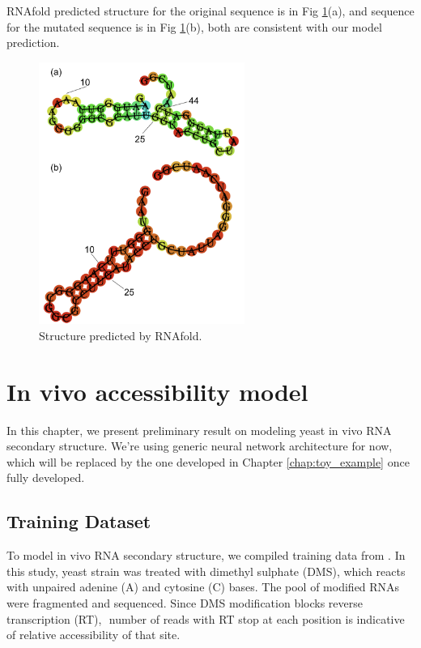 \documentclass{proposal}
\begin{document}
RNAfold predicted structure for the original sequence is in Fig \ref{fig:base_pair_rnafold_structure}(a),
and sequence for the mutated sequence is in Fig \ref{fig:base_pair_rnafold_structure}(b),
both are consistent with our model prediction.


\begin{figure}[h!]
    \centering
    \includegraphics[width=0.6\textwidth]{plot/base_pair_rnafold_structure.png}
    \caption{Structure predicted by RNAfold.}
    \label{fig:base_pair_rnafold_structure}
    \centering
\end{figure}




\chapter{In vivo accessibility model} \label{chap:vivo_model}

In this chapter, we present preliminary result on modeling yeast in vivo RNA secondary structure.
We're using generic neural network architecture for now, which will be replaced by the one
developed in Chapter \ref{chap:toy_example} once fully developed.

\section{Training Dataset}

To model in vivo RNA secondary structure, we compiled training data from \cite{rouskin2014genome}.
In this study, yeast strain was treated with ﻿dimethyl sulphate (DMS), which reacts with ﻿unpaired adenine (A) and cytosine (C) bases.
The pool of modified RNAs were fragmented and sequenced.
Since ﻿DMS modification blocks reverse transcription (RT), ﻿
number of reads with RT stop at each position is indicative of relative accessibility of that site.
\end{document}
